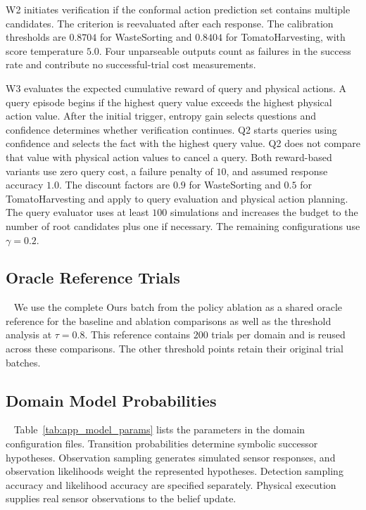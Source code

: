W2 initiates verification if the conformal action prediction set contains multiple candidates. The criterion is reevaluated after each response. The calibration thresholds are $0.8704$ for WasteSorting and $0.8404$ for TomatoHarvesting, with score temperature $5.0$. Four unparseable outputs count as failures in the success rate and contribute no successful-trial cost measurements.

W3 evaluates the expected cumulative reward of query and physical actions. A query episode begins if the highest query value exceeds the highest physical action value. After the initial trigger, entropy gain selects questions and confidence determines whether verification continues. Q2 starts queries using confidence and selects the fact with the highest query value. Q2 does not compare that value with physical action values to cancel a query. Both reward-based variants use zero query cost, a failure penalty of $10$, and assumed response accuracy $1.0$. The discount factors are $0.9$ for WasteSorting and $0.5$ for TomatoHarvesting and apply to query evaluation and physical action planning. The query evaluator uses at least $100$ simulations and increases the budget to the number of root candidates plus one if necessary. The remaining configurations use $\gamma=0.2$. 

\subsection{Oracle Reference Trials}~\label{appx:oracle_reference}
We use the complete Ours batch from the policy ablation as a shared oracle reference for the baseline and ablation comparisons as well as the threshold analysis at $\tau=0.8$. This reference contains $200$ trials per domain and is reused across these comparisons. The other threshold points retain their original trial batches.

\subsection{Domain Model Probabilities}~\label{appx:model_params}
Table~\ref{tab:app_model_params} lists the parameters in the domain configuration files. Transition probabilities determine symbolic successor hypotheses. Observation sampling generates simulated sensor responses, and observation likelihoods weight the represented hypotheses. Detection sampling accuracy and likelihood accuracy are specified separately. Physical execution supplies real sensor observations to the belief update.

